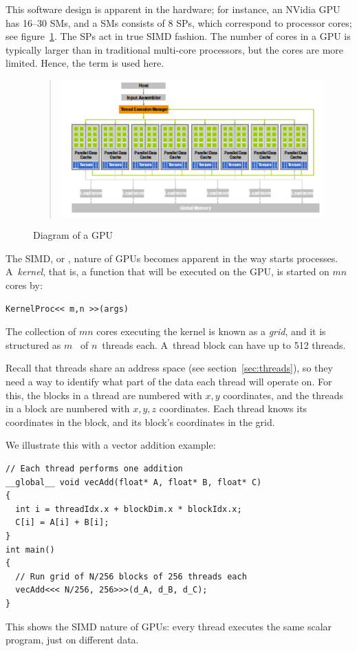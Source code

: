 This software design is apparent in the hardware; for instance, an
NVidia \ac{GPU} has 16--30 \acfp{SM}, and a \acp{SM} consists of 8
\acfp{SP}, which correspond to processor cores; see
figure~\ref{fig:gpu-diagram}. The \acp{SP} act in true SIMD fashion.
The number of cores in a \ac{GPU} is
typically larger than in traditional multi-core processors, but the
cores are more limited. Hence, the term  is used here.

\begin{figure}[ht]
  \begin{quote}
    \includegraphics[scale=.6]{graphics-public/gpu1}
  \end{quote}
  \caption{Diagram of a GPU}
  \label{fig:gpu-diagram}
\end{figure}

The \ac{SIMD}, or , nature of \acp{GPU} becomes
apparent in the way  starts
processes. A~\emph{kernel}, that is, a function that will
be executed on the \ac{GPU}, is started on $mn$ cores by:
\begin{verbatim}
KernelProc<< m,n >>(args)
\end{verbatim}
The collection of $mn$ cores executing the kernel is known as a
\emph{grid}, and it is structured as
$m$~ of $n$~threads each. 
A~thread block can have up to 512 threads.

Recall that threads share an address space (see
section~\ref{sec:threads}), so they need a way to identify what part
of the data each thread will operate on. For this, the blocks in a
thread are numbered with $x,y$ coordinates, and the threads in a block
are numbered with $x,y,z$ coordinates. Each thread knows its
coordinates in the block, and its block's coordinates in the grid.

We illustrate this with a vector addition example:
\begin{verbatim}
// Each thread performs one addition
__global__ void vecAdd(float* A, float* B, float* C)
{
  int i = threadIdx.x + blockDim.x * blockIdx.x;
  C[i] = A[i] + B[i];
}
int main()
{
  // Run grid of N/256 blocks of 256 threads each
  vecAdd<<< N/256, 256>>>(d_A, d_B, d_C);
}
\end{verbatim}
This shows the \ac{SIMD} nature of \acp{GPU}: every thread executes
the same scalar program, just on different data.

